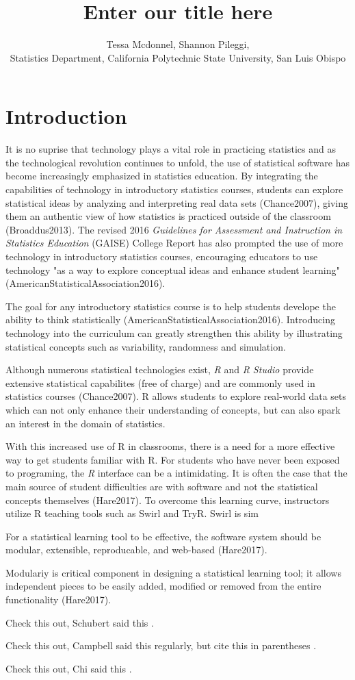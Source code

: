 \documentclass{tise_style}
\title{Enter our title here}
\author{Tessa Mcdonnel, Shannon Pileggi,  \\Statistics Department, California Polytechnic State University, San Luis Obispo}
\begin{document}
\section{Introduction}

It is no suprise that technology plays a vital role in practicing statistics and as the technological revolution continues to 
unfold, the use of statistical software has become increasingly emphasized in statistics education. By integrating the 
capabilities of technology in introductory statistics courses, students can explore statistical ideas by analyzing and 
interpreting real data sets (Chance2007), giving them an authentic view of how statistics is practiced outside of the 
classroom (Broaddus2013). The revised 2016 \textit{Guidelines for Assessment and Instruction in Statistics Education} (GAISE) 
College Report has also prompted the use of more technology in introductory statistics courses, encouraging educators to use technology "as a way to explore conceptual ideas and enhance student learning" (AmericanStatisticalAssociation2016).



The goal for any introductory statistics course is to help students develope the ability to think statistically (AmericanStatisticalAssociation2016). 
Introducing technology into the curriculum can greatly strengthen this ability by illustrating statistical concepts such as variability, randomness and simulation.

Although numerous statistical technologies exist, \textit{R} and \textit{R Studio} provide extensive statistical capabilites (free of charge) and are commonly used in statistics courses (Chance2007). R allows students to explore real-world data sets which can not only enhance their understanding of concepts, but can also spark an interest in the domain of statistics.


With this increased use of R in classrooms, there is a need for a more effective way to get students familiar with R.
For students who have never been exposed to programing, the \textit{R} interface can be a intimidating. It is often the case
that the main source of student difficulties are with software and not the statistical concepts themselves (Hare2017). To 
overcome this learning curve, instructors utilize R teaching tools such as Swirl and TryR. Swirl is sim



For a statistical learning tool to be effective, the software system should be modular, extensible, reproducable, and web-based (Hare2017). 

Modulariy is critical component in designing a statistical learning tool; it allows independent pieces to be easily added, modified or removed from the entire functionality (Hare2017). 


Check this out, Schubert said this \cite{Schubert13}.


Check this out, Campbell said this \cite{Campbell02} regularly, but cite this in parentheses \citep{Campbell02}.


Check this out, Chi said this \cite{Chi81}.




\end{document}
